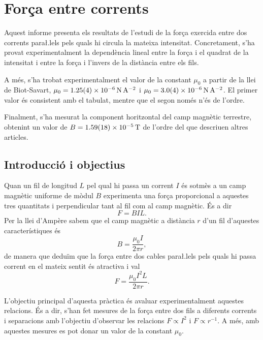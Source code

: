 \chapter{Força entre corrents}
\begin{resum}
	Aquest informe presenta els resultats de l'estudi de la força exercida entre dos corrents para\l.lels pels quals hi circula la mateixa intensitat. Concretament, s'ha provat experimentalment la dependència lineal entre la força i el quadrat de la intensitat i entre la força i l'invers de la distància entre els fils.

	A més, s'ha trobat experimentalment el valor de la constant \( \mu_0 \) a partir de la llei de Biot-Savart, \( \mu_0 = \data{1.25}{0.04e-6}{N.A^{-2}} \) i \( \mu_0 = \data{3.0}{0.4d-6}{N.A^{-2}} \). El primer valor és consistent amb el tabulat, mentre que el segon només n'és de l'ordre. 

	Finalment, s'ha mesurat la component horitzontal del camp magnètic terrestre, obtenint un valor de \( B = \data{1.59}{0.18d-5}{T} \) de l'ordre del que descriuen altres articles.
\end{resum}

\section{Introducció i objectius}
Quan un fil de longitud \( L \) pel qual hi passa un corrent \( I \) és sotmès a un camp magnètic uniforme de mòdul \( B \) experimenta una força proporcional a aquestes tres quantitats i perpendicular tant al fil com al camp magnètic. És a dir
\begin{equation} \label{eq:forca magnetica} 
	F = BIL.
\end{equation}
Per la llei d'Ampère sabem que el camp magnètic a distància \( r \) d'un fil d'aquestes característiques és 
\begin{equation*}
	B = \frac{\mu_0 I}{2\pi r},
\end{equation*}
de manera que deduïm que la força entre dos cables para\l.lels pels quals hi passa corrent en el mateix sentit és atractiva i val
\begin{equation} \label{eq:forca i corrent}
	F = \frac{\mu_0I^2L}{2\pi r}.
\end{equation}

L'objectiu principal d'aquesta pràctica és avaluar experimentalment aquestes relacions. És a dir, s'han fet mesures de la força entre dos fils a diferents corrents i separacions amb l'objectiu d'observar les relacions \( F \propto I^2 \) i \( F \propto r^{-1} \). A més, amb aquestes mesures es pot donar un valor de la constant \( \mu_0 \).  

